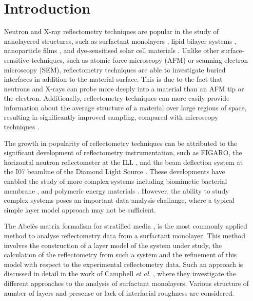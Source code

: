 \documentclass[amsmath,amssymb,twocolumn,superscriptaddress,aps,prl]{revtex4-1}
\begin{document}
\section{Introduction}
Neutron and X-ray reflectometry techniques are popular in the study of nanolayered structures, such as surfactant monolayers \cite{Hazell2016}, lipid bilayer systems \cite{Belicka2015}, nanoparticle films \cite{Velleman2016}, and dye-sensitised solar cell materials \cite{McCreeGrey2015}.
Unlike other surface-sensitive techniques, such as atomic force microscopy (AFM) or scanning electron microscopy (SEM), reflectometry techniques are able to investigate buried interfaces in addition to the material surface.
This is due to the fact that neutrons and X-rays can probe more deeply into a material than an AFM tip or the electron.
Additionally, reflectometry techniques can more easily provide information about the average structure of a material over large regions of space, resulting in significantly improved sampling, compared with microscopy techniques \cite{Renaud2009}.

The growth in popularity of reflectometry techniques can be attributed to the significant development of reflectometry instrumentation, such as FIGARO, the horizontal neutron reflectometer at the ILL \cite{Campbell2011}, and the beam deflection system at the I07 beamline of the Diamond Light Source \cite{Arnold2012}.
These developments have enabled the study of more complex systems including biomimetic bacterial membrane \cite{Barker2016}, and polymeric energy materials \cite{Khodakarimi2016}.
However, the ability to study complex systems poses an important data analysis challange, where a typical simple layer model approach may not be sufficient.

The Abel\`{e}s matrix formalism for stratified media \cite{Abeles1950}, is the most commonly applied method to analyse reflectometry data from a surfactant monolayer.
This method involves the construction of a layer model of the system under study, the calculation of the reflectometry from such a system and the refinement of this model with respect to the experimental reflectometry data.
Such an approach is discussed in detail in the work of Campbell \emph{et al.} \cite{Campbell2018}, where they investigate the different approaches to the analysis of surfactant monolayers.
Various structure of number of layers and presense or lack of interfacial roughness are considered.
\end{document}
